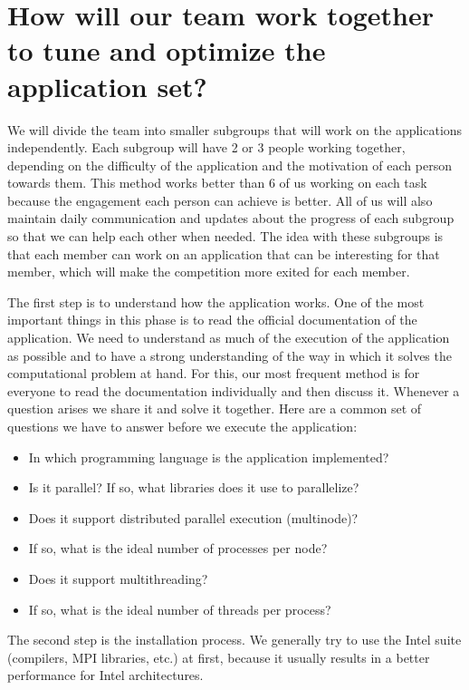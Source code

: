 \documentclass[11pt,a4paper,twocolumn]{article}
\begin{document}
\section{How will our team work together to tune and optimize the application set?}

We will divide the team into smaller subgroups that will work on the applications independently. Each subgroup will have 2 or 3 people working together, depending on the difficulty of the application and the motivation of each person towards them. This method works better than 6 of us working on each task because the engagement each person can achieve is better. All of us will also maintain daily communication and updates about the progress of each subgroup so that we can help each other when needed. The idea with these subgroups is that each member can work on an application that can be interesting for that member, which will make the competition more exited for each member.

The first step is to understand how the application works. One of the most important things in this phase is to read the official documentation of the application. We need to understand as much of the execution of the application as possible and to have a strong understanding of the way in which it solves the computational problem at hand. For this, our most frequent method is for everyone to read the documentation individually and then discuss it. Whenever a question arises we share it and solve it together. Here are a common set of questions we have to answer before we execute the application:
\begin{itemize}
    \item In which programming language is the application implemented?
    \item Is it parallel? If so, what libraries does it use to parallelize?
    \item Does it support distributed parallel execution (multinode)?
    \item If so, what is the ideal number of processes per node?
    \item Does it support multithreading?
    \item If so, what is the ideal number of threads per process?
\end{itemize}

The second step is the installation process. We generally try to use the Intel suite (compilers, MPI libraries, etc.) at first, because it usually results in a better performance for Intel architectures.
\end{document}
